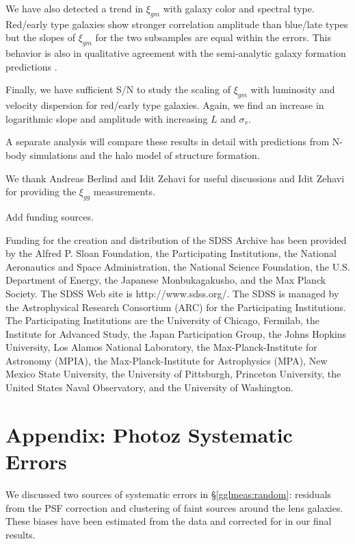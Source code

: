 \documentclass{emulateapj}
\begin{document}
We have also detected a trend in $\xi_{gm}$ with galaxy color and 
spectral type. Red/early type galaxies show stronger correlation amplitude 
than blue/late types but the slopes of $\xi_{gm}$ for the two subsamples 
are equal within the errors. This behavior is also in qualitative 
agreement with the semi-analytic galaxy formation predictions 
\citep{Guzik01}.

Finally, we have sufficient S/N to study the scaling of $\xi_{gm}$ 
with luminosity and velocity dispersion for red/early type galaxies. 
Again, we find an increase in logarithmic slope and amplitude with 
increasing $L$ and $\sigma_v$. 

A separate analysis will compare these results in detail with 
predictions from N-body simulations and the halo model of structure 
formation.


\acknowledgments

We thank Andreas Berlind and Idit Zehavi for useful discussions and 
Idit Zehavi for providing the $\xi_{gg}$ measurements.

Add funding sources.

Funding for the creation and distribution of the SDSS Archive has been provided
by the Alfred P. Sloan Foundation, the Participating Institutions, the National
Aeronautics and Space Administration, the National Science Foundation, the
U.S. Department of Energy, the Japanese Monbukagakusho, and the Max Planck
Society. The SDSS Web site is http://www.sdss.org/.
The SDSS is managed by the Astrophysical Research Consortium (ARC) for the
Participating Institutions. The Participating Institutions are the University
of Chicago, Fermilab, the Institute for Advanced Study, the Japan Participation
Group, the Johns Hopkins University, Los Alamos National Laboratory, the
Max-Planck-Institute for Astronomy (MPIA), the Max-Planck-Institute for
Astrophysics (MPA), New Mexico State University, the University of Pittsburgh,
Princeton University, the United States Naval Observatory, and the University
of Washington.

\section{Appendix: Photoz Systematic Errors} \label{systematics}

We discussed two sources of 
systematic errors in \S \ref{gglmeas:random}: residuals
from the PSF correction and clustering of faint sources around the lens
galaxies.  These biases have been estimated from the data 
and corrected for in our final results.
\end{document}

